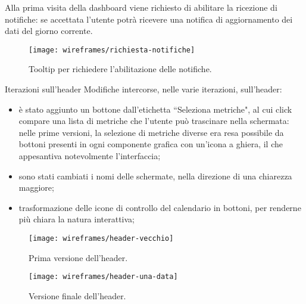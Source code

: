 \documentclass[../../../main.tex]{subfiles}
\begin{document}
Alla prima visita della dashboard viene richiesto di abilitare la ricezione di notifiche: se accettata l'utente potrà ricevere una notifica di aggiornamento dei dati del giorno corrente.
\begin{figure}[H]
    \centering
    \texttt{[image: wireframes/richiesta-notifiche]}
    \caption{Tooltip per richiedere l'abilitazione delle notifiche.}\label{fig:richiesta-notifiche}
\end{figure}


\begin{bclogo}{Iterazioni sull'header}
Modifiche intercorse, nelle varie iterazioni, sull'header:
\begin{itemize}
    \item è stato aggiunto un bottone dall'etichetta ``Seleziona metriche", al cui click compare una lista di metriche che l'utente può trascinare nella schermata: nelle prime versioni, la selezione di metriche diverse era resa possibile da bottoni presenti in ogni componente grafica con un'icona a ghiera, il che appesantiva notevolmente l'interfaccia;
    \item sono stati cambiati i nomi delle schermate, nella direzione di una chiarezza maggiore;
    \item trasformazione delle icone di controllo del calendario in bottoni, per renderne più chiara la natura interattiva;
\end{itemize}
\begin{figure}[H]
    \centering
    \texttt{[image: wireframes/header-vecchio]}
    \caption{Prima versione dell'header.}
    \label{fig:header-vecchio}
\end{figure}
\begin{figure}[H]
    \centering
    \texttt{[image: wireframes/header-una-data]}
    \caption{Versione finale dell'header.}
    \label{fig:header-finale}
\end{figure}
\end{bclogo}
\end{document}
